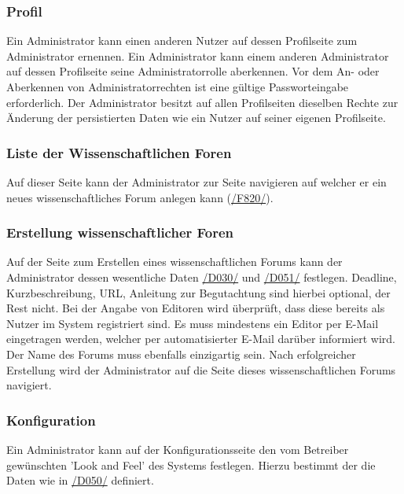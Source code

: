 \subsubsection{Profil}
\begin{description}
     Ein Administrator kann einen anderen Nutzer auf dessen Profilseite zum Administrator ernennen.
     Ein Administrator kann einem anderen Administrator auf dessen Profilseite seine
    Administratorrolle aberkennen.
     Vor dem An- oder Aberkennen von Administratorrechten ist eine gültige
    Passworteingabe erforderlich.
     Der Administrator besitzt auf allen Profilseiten dieselben Rechte zur Änderung
    der persistierten Daten wie ein Nutzer auf seiner eigenen Profilseite. %
\end{description}

\subsubsection{Liste der Wissenschaftlichen Foren}
\begin{description}
     Auf dieser Seite kann der Administrator zur Seite navigieren auf welcher er ein neues
    wissenschaftliches Forum anlegen kann (\hyperref[funkt:820]{/F820/}).
\end{description}

\subsubsection{Erstellung wissenschaftlicher Foren}
\begin{description}
     Auf der Seite zum Erstellen eines wissenschaftlichen Forums kann der Administrator dessen
    wesentliche Daten \hyperref[d030]{/D030/} und \hyperref[d051]{/D051/}
    festlegen. Deadline, Kurzbeschreibung, URL, Anleitung zur Begutachtung sind hierbei optional, der Rest nicht.
    Bei der Angabe von Editoren wird überprüft, dass diese bereits als Nutzer im System registriert sind.
    Es muss mindestens ein Editor per E-Mail eingetragen werden, welcher per automatisierter E-Mail darüber informiert wird.
    Der Name des Forums muss ebenfalls einzigartig sein.
    Nach erfolgreicher Erstellung wird der Administrator auf die Seite dieses wissenschaftlichen Forums
    navigiert.
\end{description}

\subsubsection{Konfiguration}
\begin{description}
     Ein Administrator kann auf der Konfigurationsseite den vom Betreiber gewünschten
    'Look and Feel' des Systems festlegen. Hierzu bestimmt der die Daten wie in \hyperref[d050]{/D050/} definiert.
\end{description}

